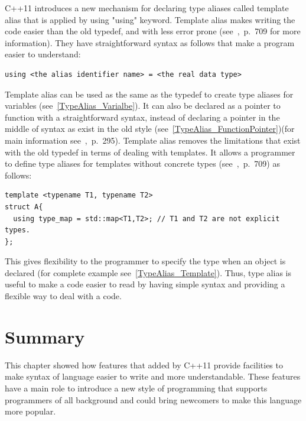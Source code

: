\documentclass[11pt]{report}
\begin{document}
C++11 introduces a new mechanism for declaring type aliases called template alias that is applied by using "using" keyword. Template alias makes writing the code easier than the old typedef, and with less error prone \linebreak (see~\cite{Gregorie:professionalcpp},~p.~709 for more information). They have straightforward syntax as follows that make a program easier to understand:
\begin{lstlisting}
using <the alias identifier name> = <the real data type>
\end{lstlisting}
Template alias can be used as the same as the typedef to create type aliases for variables (see~\ref{TypeAlias_Varialbe}). It can also be declared as a pointer to function with a straightforward syntax, instead of declaring a pointer in the middle of syntax as exist in the old style (see~\ref{TypeAlias_FunctionPointer})(for main information see~\cite{Gregorie:professionalcpp},~p.~295). Template alias removes the limitations that exist with the old typedef in terms of dealing with templates. It allows a programmer to define type aliases for templates without concrete types (see~\cite{Gregorie:professionalcpp},~p.~709) as follows:
\begin{lstlisting}
template <typename T1, typename T2>
struct A{
  using type_map = std::map<T1,T2>; // T1 and T2 are not explicit types.
};
\end{lstlisting}
This gives flexibility to the programmer to specify the type when an object is declared (for complete example see~\ref{TypeAlias_Template}). Thus, type alias is useful to make a code easier to read by having simple syntax and providing a flexible way to deal with a code.

\section{Summary}
\label{sect: Summary}
This chapter showed how features that added by C++11 provide facilities to make syntax of language easier to write and more understandable. These features have a main role to introduce a new style of programming that supports programmers of all background and could bring newcomers to make this language more popular.

\end{document}
